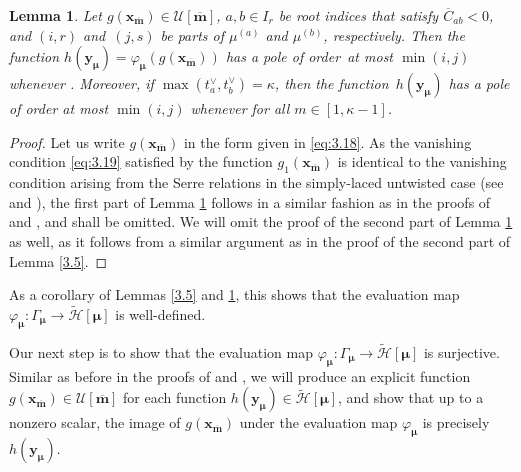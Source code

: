\documentclass[10pt,a4paper]{amsart}
\numberwithin{equation}{section}
\newtheorem{Lemma}[Theorem]{Lemma}
\begin{document}
\begin{Lemma}\label{3.6}
Let $g(\mathbf{x}_{\overline{\mathbf{m}}})\in\mathcal{U}[\overline{\mathbf{m}}]$, $a,b\in I_r$ be root indices that satisfy $\overline{C}_{ab}<0$, and $(i,r)$ and~${(j,s)}$ be parts of $\mu^{(a)}$ and $\mu^{(b)}$, respectively. Then the function $h(\mathbf{y}_{\bm{\mu}})=\varphi_{\bm{\mu}}(g(\mathbf{x}_{\overline{\mathbf{m}}}))$ has a pole of order~at most $\min(i,j)$ whenever . Moreover, if $\max(t_a^{\vee},t_b^{\vee})=\kappa$, then the function~$h(\mathbf{y}_{\bm{\mu}})$ has a pole of order at most $\min(i,j)$ whenever  for all $m\in[1,\kappa-1]$.
\end{Lemma}

\begin{proof}
Let us write $g(\mathbf{x}_{\overline{\mathbf{m}}})$ in the form given in \eqref{eq:3.18}. As the vanishing condition \eqref{eq:3.19} satisfied by the function $g_1(\mathbf{x}_{\overline{\mathbf{m}}})$ is identical to the vanishing condition arising from the Serre relations in the simply-laced untwisted case (see \cite[equation~(3.15)]{AKS06} and \cite[equation~(4.4)]{AK07}), the first part of Lemma \ref{3.6} follows in a similar fashion as in the proofs of \cite[Lemma 3.8]{AKS06} and \cite[Lemma A.2]{AK07}, and shall be omitted. We will omit the proof of the second part of Lemma \ref{3.6} as well, as it follows from a similar argument as in the proof of the second part of Lemma \ref{3.5}.
\end{proof}

As a corollary of Lemmas \ref{3.5} and \ref{3.6}, this shows that the evaluation map $\varphi_{\bm{\mu}}\colon\Gamma_{\bm{\mu}} \to\tilde{\mathcal{H}}[\bm{\mu}]$ is well-defined.

Our next step is to show that the evaluation map $\varphi_{\bm{\mu}}\colon\Gamma_{\bm{\mu}} \to\tilde{\mathcal{H}}[\bm{\mu}]$ is surjective. Similar as before in the proofs of \cite[Lemma 3.16]{AKS06} and \cite[Theorem A.4]{AK07}, we will produce an explicit function $g(\mathbf{x}_{\overline{ \mathbf{m}}})\in\mathcal{U}[\overline{\mathbf{m}}]$ for each function $h(\mathbf{y}_{\bm{\mu}})\in \tilde{\mathcal{H}}[\bm{\mu}]$, and show that up to a nonzero scalar, the image of $g(\mathbf{x}_{\overline{\mathbf{m}}})$ under the evaluation map $\varphi_{\bm{\mu}}$ is precisely $h(\mathbf{y}_{\bm{\mu}})$.
\end{document}
